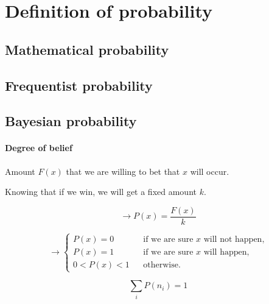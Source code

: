 

\section{Definition of probability}
\label{sec:def_of_prob}

\subsection{Mathematical probability}

\lipsum[6-7]

\subsection{Frequentist probability}

\lipsum[7-8]

\subsection{Bayesian probability}
\label{subsec:bayesian_prob}

\paragraph{Degree of belief}

Amount $F(x)$ that we are willing to bet that $x$ will occur.

Knowing that if we win, we will get a fixed amount $k$.

\begin{equation}
	\to P(x) = \frac{F(x)}{k}
\end{equation}

\begin{equation}
	\to \left\{
	\begin{array}{rcl}
		P(x) = 0 & & {\textrm{if we are sure } x \textrm{ will not happen,}}\\
		P(x) = 1 & & {\textrm{if we are sure } x \textrm{ will happen,}}\\
		0 < P(x) < 1 & & {\textrm{otherwise.}}
	\end{array} \right.
\end{equation}

\begin{equation}\label{eq:norm_cond}
	\sum_{i} P(n_{i}) = 1
\end{equation}

